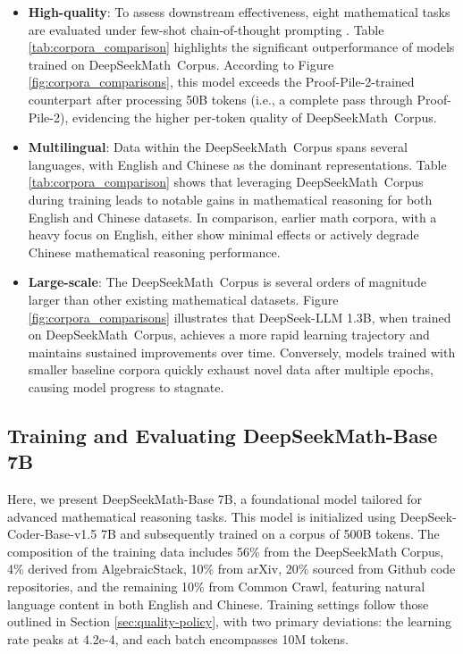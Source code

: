 \begin{itemize}[topsep=0pt]
    \item \textbf{High-quality}:
    To assess downstream effectiveness, eight mathematical tasks are evaluated under few-shot chain-of-thought prompting \cite{cot}. Table \ref{tab:corpora_comparison} highlights the significant outperformance of models trained on DeepSeekMath~Corpus. According to Figure \ref{fig:corpora_comparisons}, this model exceeds the Proof-Pile-2-trained counterpart after processing 50B tokens (i.e., a complete pass through Proof-Pile-2), evidencing the higher per-token quality of DeepSeekMath~Corpus.
    \item \textbf{Multilingual}:
    Data within the DeepSeekMath~Corpus spans several languages, with English and Chinese as the dominant representations. Table \ref{tab:corpora_comparison} shows that leveraging DeepSeekMath~Corpus during training leads to notable gains in mathematical reasoning for both English and Chinese datasets. In comparison, earlier math corpora, with a heavy focus on English, either show minimal effects or actively degrade Chinese mathematical reasoning performance.
    \item \textbf{Large-scale}:
    The DeepSeekMath~Corpus is several orders of magnitude larger than other existing mathematical datasets. Figure \ref{fig:corpora_comparisons} illustrates that DeepSeek-LLM 1.3B, when trained on DeepSeekMath~Corpus, achieves a more rapid learning trajectory and maintains sustained improvements over time. Conversely, models trained with smaller baseline corpora quickly exhaust novel data after multiple epochs, causing model progress to stagnate.
\end{itemize}

\subsection{Training and Evaluating DeepSeekMath-Base 7B}

Here, we present DeepSeekMath-Base 7B, a foundational model tailored for advanced mathematical reasoning tasks. This model is initialized using DeepSeek-Coder-Base-v1.5 7B \citep{deepseek-coder} and subsequently trained on a corpus of 500B tokens. The composition of the training data includes 56\% from the DeepSeekMath Corpus, 4\% derived from AlgebraicStack, 10\% from arXiv, 20\% sourced from Github code repositories, and the remaining 10\% from Common Crawl, featuring natural language content in both English and Chinese. Training settings follow those outlined in Section \ref{sec:quality-policy}, with two primary deviations: the learning rate peaks at 4.2e-4, and each batch encompasses 10M tokens.

